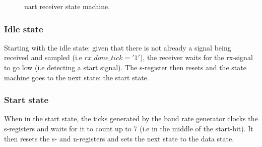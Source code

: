 \documentclass[main.tex]{subfiles}
\begin{document}
\begin{figure}[!htp]
\begin{center}
\caption{\gls{uart} receiver state machine.}
\label{fig:uartrx}
\end{center}
\end{figure}

\subsubsection{Idle state}
Starting with the idle state: given that there is not already a signal being received and sampled (i.e $rx\_done\_tick = '1'$), the receiver waits for the rx-signal to go low (i.e detecting a start signal). The s-register then resets and the state machine goes to the next state: the start state. 

\subsubsection{Start state}
When in the start state, the ticks generated by the baud rate generator clocks the s-registers and waits for it to count up to 7 (i.e in the middle of the start-bit). It then resets the s- and n-registers and sets the next state to the data state. 
\end{document}
